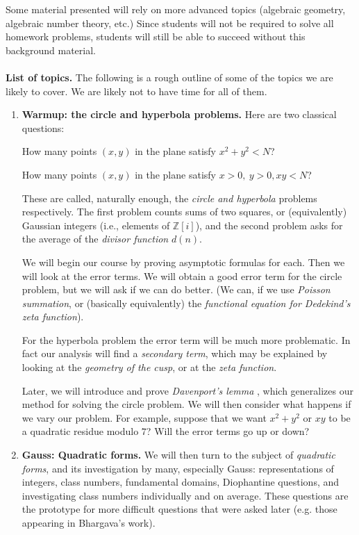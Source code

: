 \documentclass[11pt]{amsart}
\theoremstyle{remark}
\numberwithin{theorem}{section} \numberwithin{equation}{section}
\begin{document}
Some material presented will rely on more advanced topics (algebraic geometry, algebraic number theory, etc.)
Since students will not be required to solve all homework problems, students will still be able to succeed
without this background material.
\\
\\
{\bf List of topics.} The following is a rough outline of some of the topics we are likely to cover. We are likely not to have time for all of them.
\begin{enumerate}[1.]
\item {\bf Warmup: the circle and hyperbola problems.}
Here are two classical questions:
\begin{center}
How many points $(x, y)$ in the plane satisfy $x^2 + y^2 < N$?

\smallskip
How many points $(x, y)$ in the plane satisfy $x > 0, \ y > 0, xy < N$?
\end{center}
These are called, naturally enough, the {\itshape circle and hyperbola} problems respectively. The first problem
counts sums of two squares, or (equivalently) Gaussian integers (i.e., elements of $\mathbb{Z}[i]$), and the
second problem asks for the average of the {\itshape divisor function} $d(n)$. 

We will begin our course by proving asymptotic formulas for each. Then we will look at the error terms. We will
obtain a good error term for the circle problem, but we will ask if we can do better. (We can, if we use
{\itshape Poisson summation}, or (basically equivalently) the {\itshape functional equation for Dedekind's zeta
function}). 

For the hyperbola problem the error term will be much more problematic. In fact our analysis will find a
{\itshape secondary term}, which may be explained by looking at the {\itshape geometry of the cusp},
or at the {\itshape zeta function}.

Later, we will introduce and prove {\itshape Davenport's lemma} \cite{D}, which generalizes our method for solving
the circle problem. We will then consider what happens if we vary our problem. For example, suppose that we want
$x^2 + y^2$ or $xy$ to be a quadratic residue modulo $7$? Will the error terms go up or down?

\item {\bf Gauss: Quadratic forms.} 
We will then turn to the subject of {\itshape quadratic forms}, and its investigation by many, especially Gauss: 
representations of integers, class numbers, fundamental domains, Diophantine
questions, and investigating class numbers individually and on average. These questions are the prototype for
more difficult questions that were asked later (e.g. those appearing in Bhargava's work).


\end{enumerate}
\end{document}
